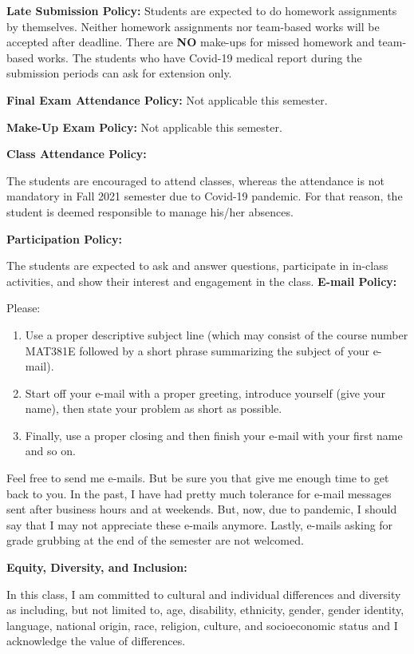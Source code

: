 \documentclass[
  12pt,
]{article}
\providecommand{\tightlist}{%
  \setlength{\itemsep}{0pt}\setlength{\parskip}{0pt}}
\begin{document}
\textbf{Late Submission Policy:} Students are expected to do homework
assignments by themselves. Neither homework assignments nor team-based
works will be accepted after deadline. There are \textbf{NO} make-ups
for missed homework and team-based works. The students who have Covid-19
medical report during the submission periods can ask for extension only.

\textbf{Final Exam Attendance Policy:} Not applicable this semester.

\textbf{Make-Up Exam Policy:} Not applicable this semester.

\textbf{Class Attendance Policy:}

The students are encouraged to attend classes, whereas the attendance is
not mandatory in Fall 2021 semester due to Covid-19 pandemic. For that
reason, the student is deemed responsible to manage his/her absences.

\textbf{Participation Policy:}

The students are expected to ask and answer questions, participate in
in-class activities, and show their interest and engagement in the
class. \textbf{E-mail Policy:}

Please:

\begin{enumerate}
\def\labelenumi{\arabic{enumi}.}
\tightlist
\item
  Use a proper descriptive subject line (which may consist of the course
  number MAT381E followed by a short phrase summarizing the subject of
  your e-mail).
\item
  Start off your e-mail with a proper greeting, introduce yourself (give
  your name), then state your problem as short as possible.
\item
  Finally, use a proper closing and then finish your e-mail with your
  first name and so on.
\end{enumerate}

Feel free to send me e-mails. But be sure you that give me enough time
to get back to you. In the past, I have had pretty much tolerance for
e-mail messages sent after business hours and at weekends. But, now, due
to pandemic, I should say that I may not appreciate these e-mails
anymore. Lastly, e-mails asking for grade grubbing at the end of the
semester are not welcomed.

\textbf{Equity, Diversity, and Inclusion:}

In this class, I am committed to cultural and individual differences and
diversity as including, but not limited to, age, disability, ethnicity,
gender, gender identity, language, national origin, race, religion,
culture, and socioeconomic status and I acknowledge the value of
differences.
\end{document}

